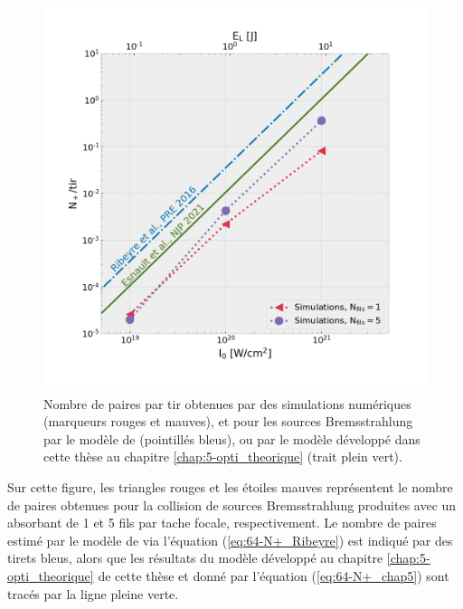 \begin{refsection}
\begin{figure}[hbtp]
	\centering
	\includegraphics[width=\linewidth]{6-opti_numerique/resultats_paires.png}
	\caption{Nombre de paires par tir obtenues par des simulations numériques (marqueurs rouges et mauves), et pour les sources Bremsstrahlung par le modèle de \cite{ribeyre_2016} (pointillés bleus), ou par le modèle développé dans cette thèse au chapitre \ref{chap:5-opti_theorique} (trait plein vert).}
	\label{fig:64-paires_BWL}
\end{figure}

Sur cette figure, les triangles rouges et les étoiles mauves représentent le nombre de paires obtenues pour la collision de sources Bremsstrahlung produites avec un absorbant de 1 et 5 fils par tache focale, respectivement. Le nombre de paires estimé par le modèle de \cite{ribeyre_2016} via l'équation (\ref{eq:64-N+_Ribeyre}) est indiqué par des tirets bleus, alors que les résultats du modèle développé au chapitre \ref{chap:5-opti_theorique} de cette thèse et donné par l'équation (\ref{eq:64-N+_chap5}) sont tracés par la ligne pleine verte. 


\end{refsection}
